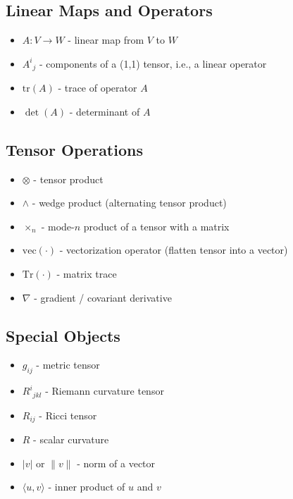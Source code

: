 \documentclass[
  letterpaper,
  DIV=11,
  numbers=noendperiod]{scrreprt}
\providecommand{\tightlist}{%
  \setlength{\itemsep}{0pt}\setlength{\parskip}{0pt}}
\begin{document}
\subsection{Linear Maps and Operators}\label{linear-maps-and-operators}

\begin{itemize}
\tightlist
\item
  \(A: V \to W\) - linear map from \(V\) to \(W\)
\item
  \(A^i{}_j\) - components of a (1,1) tensor, i.e., a linear operator
\item
  \(\mathrm{tr}(A)\) - trace of operator \(A\)
\item
  \(\det(A)\) - determinant of \(A\)
\end{itemize}

\subsection{Tensor Operations}\label{tensor-operations}

\begin{itemize}
\tightlist
\item
  \(\otimes\) - tensor product
\item
  \(\wedge\) - wedge product (alternating tensor product)
\item
  \(\times_n\) - mode-\(n\) product of a tensor with a matrix
\item
  \(\mathrm{vec}(\cdot)\) - vectorization operator (flatten tensor into
  a vector)
\item
  \(\mathrm{Tr}(\cdot)\) - matrix trace
\item
  \(\nabla\) - gradient / covariant derivative
\end{itemize}

\subsection{Special Objects}\label{special-objects}

\begin{itemize}
\tightlist
\item
  \(g_{ij}\) - metric tensor
\item
  \(R^i{}_{jkl}\) - Riemann curvature tensor
\item
  \(R_{ij}\) - Ricci tensor
\item
  \(R\) - scalar curvature
\item
  \(|v|\) or \(\|v\|\) - norm of a vector
\item
  \(\langle u, v \rangle\) - inner product of \(u\) and \(v\)
\end{itemize}
\end{document}
